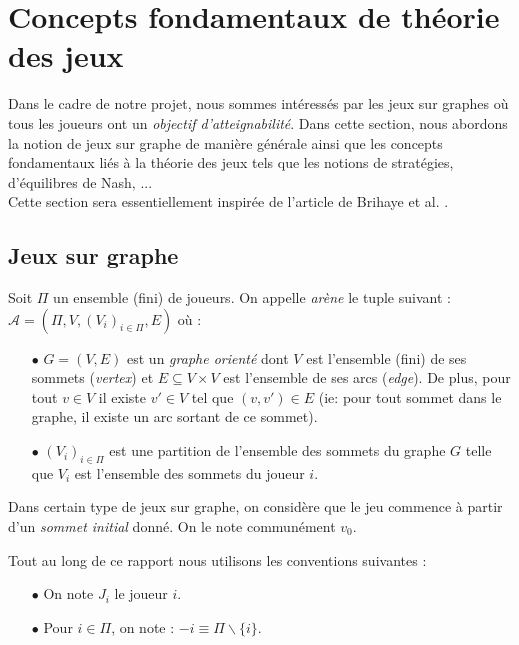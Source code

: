 
\section{Concepts fondamentaux de théorie des jeux}
Dans le cadre de notre projet, nous sommes intéressés par les jeux sur graphes où tous les joueurs ont un \textit{objectif d'atteignabilité}.
Dans cette section, nous abordons la notion de jeux sur graphe de manière générale ainsi que les concepts fondamentaux liés à la théorie des jeux tels que les notions de stratégies, d'équilibres de Nash, ...\\
Cette section sera essentiellement inspirée de l'article de Brihaye et al. \cite{DBLP:conf/lfcs/BrihayePS13}.

\subsection{Jeux sur graphe}


\begin{defi}[Arène]
	Soit $\Pi$ un ensemble (fini) de joueurs. On appelle \textit{arène} le tuple suivant :\\
	 $\mathcal{A} = (\Pi,V , (V_{i})_{i\in{\Pi}}, E )$ où :
	\begin{enumerate}
		\item[$\bullet$] $G = (V,E)$ est un \textit{graphe orienté}  dont $V$ est l'ensemble (fini) de ses sommets (\textit{vertex}) et $E \subseteq V \times V$ est l'ensemble de ses arcs (\textit{edge}). De plus, pour tout $ v\in V $ il existe $v'\in V$ tel que $(v,v') \in E$ (ie: pour tout sommet dans le graphe, il existe un arc sortant de ce sommet).
		\item[$\bullet$] $(V_{i})_{i\in\Pi}$ est une partition de l'ensemble des sommets du graphe $G$ telle que $V_{i}$ est l'ensemble des sommets du joueur $i$.
	\end{enumerate}
\end{defi}

\begin{rem}\label{sommetInit}
	Dans certain type de jeux sur graphe, on considère que le jeu commence à partir d'un \textit{sommet initial} donné. On le note communément $v_{0}$.
\end{rem}

\begin{notations}
	Tout au long de ce rapport nous utilisons les conventions suivantes :
	\begin{enumerate}
		\item[$\bullet$] On note $J_{i}$  le joueur $i$.
		
		\item[$\bullet$] Pour $i\in \Pi$, on note : $-i\equiv \Pi\backslash \{ i\} $.
	\end{enumerate}
\end{notations}

